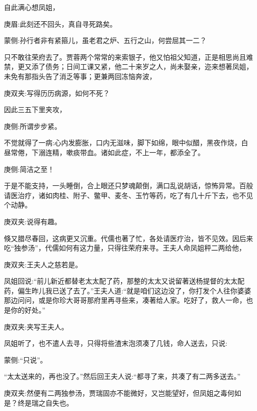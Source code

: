 \begin{parag}
    自此满心想凤姐，\begin{note}庚眉:此刻还不回头，真自寻死路矣。\end{note}\begin{note}蒙侧:孙行者非有紧箍儿，虽老君之炉、五行之山，何尝屈其一二？\end{note}只不敢往荣府去了。贾蓉两个常常的来索银子，他又怕祖父知道，正是相思尚且难禁，更又添了债务；日间工课又紧，他二十来岁之人，尚未娶亲，迩来想著凤姐，未免有那指头告了消乏等事；更兼两回冻恼奔波，\begin{note}庚双夹:写得历历病源，如何不死？\end{note}因此三五下里夹攻，\begin{note}庚侧:所谓步步紧。\end{note}不觉就得了一病:心内发膨胀，口内无滋味，脚下如绵，眼中似醋，黑夜作烧，白昼常倦，下溺连精，嗽痰带血。诸如此症，不上一年，都添全了。\begin{note}庚侧:简洁之至！\end{note}于是不能支持，一头睡倒，合上眼还只梦魂颠倒，满口乱说胡话，惊怖异常。百般请医治疗，诸如肉桂、附子、鳖甲、麦冬、玉竹等药，吃了有几十斤下去，也不见个动静。\begin{note}庚双夹:说得有趣。\end{note}
\end{parag}


\begin{parag}
    倏又腊尽春回，这病更又沉重。代儒也著了忙，各处请医疗治，皆不见效。因后来吃“独参汤”，代儒如何有这力量，只得往荣府来寻。王夫人命凤姐秤二两给他，\begin{note}庚双夹:王夫人之慈若是。\end{note}凤姐回说:“前儿新近都替老太太配了药，那整的太太又说留著送杨提督的太太配药，偏生昨儿我已送了去了。”王夫人道:“就是咱们这边没了，你打发个人往你婆婆那边问问，或是你珍大哥哥那府里再寻些来，凑著给人家。吃好了，救人一命，也是你的好处。”\begin{note}庚双夹:夹写王夫人。\end{note}凤姐听了，也不遣人去寻，只得将些渣末泡须凑了几钱，命人送去，只说:\begin{note}蒙侧:“只说”。\end{note}“太太送来的，再也没了。”然后回王夫人说:“都寻了来，共凑了有二两多送去。”\begin{note}庚双夹:然便有二两独参汤，贾瑞固亦不能微好，又岂能望好，但凤姐之毒何如是？终是瑞之自失也。\end{note}
\end{parag}


